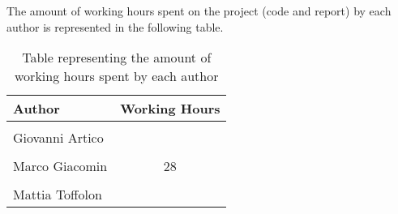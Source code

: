 \noindent
The amount of working hours spent on the project (code and report) by each author is represented in the following table.
\begin{table}[h]
    \centering
    \begin{tabular}{|l|c|}
        \hline
        \textbf{Author} & \textbf{Working Hours} \\ \hline
        \\[-1em]
        Giovanni Artico & \\ \hline
        \\[-1em]
        Marco Giacomin & 28 \\ \hline
        \\[-1em]
        Mattia Toffolon & \\ \hline
    \end{tabular}
    \caption{Table representing the amount of working hours spent by each author}
\end{table}